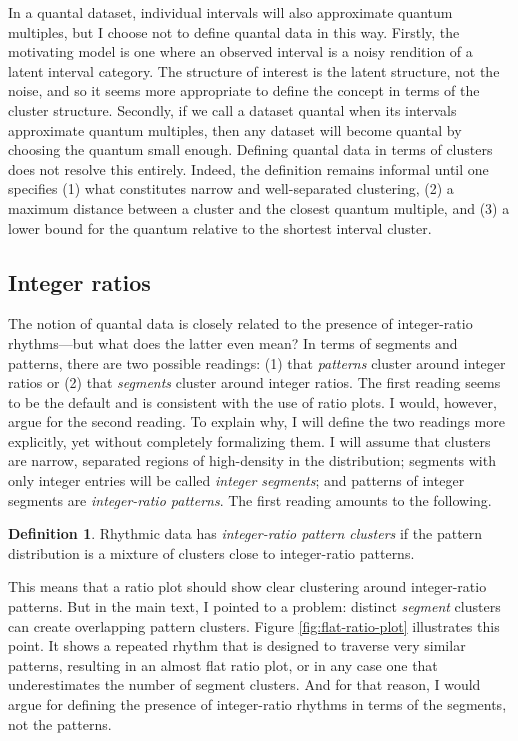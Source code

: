 \documentclass[suppldata]{tMAM2e}%
\theoremstyle{plain}
\theoremstyle{definition}
\newtheorem{definition}[theorem]{Definition}
\theoremstyle{remark}
\begin{document}
In a quantal dataset, individual intervals will also approximate quantum multiples, but I choose not to define quantal data in this way.
Firstly, the motivating model is one where an observed interval is a noisy rendition of a latent interval category.
The structure of interest is the latent structure, not the noise, and so it seems more appropriate to define the concept in terms of the cluster structure.
Secondly, if we call a dataset quantal when its intervals approximate quantum multiples, then any dataset will become quantal by choosing the quantum small enough.
Defining quantal data in terms of clusters does not resolve this entirely.
Indeed, the definition remains informal until one specifies (1) what constitutes narrow and well-separated clustering, (2) a maximum distance between a cluster and the closest quantum multiple, and (3) a lower bound for the quantum relative to the shortest interval cluster.



\subsection{Integer ratios}

The notion of quantal data is closely related to the presence of integer-ratio rhythms—but what does the latter even mean?
In terms of segments and patterns, there are two possible readings: (1) that \emph{patterns} cluster around integer ratios or (2) that \emph{segments} cluster around integer ratios.
The first reading seems to be the default and is consistent with the use of ratio plots.
I would, however, argue for the second reading.
To explain why, I will define the two readings more explicitly, yet without completely formalizing them.
I will assume that clusters are narrow, separated regions of high-density in the distribution;
segments with only integer entries will be called \emph{integer segments}; and patterns of integer segments are \emph{integer-ratio patterns}. 
The first reading amounts to the following.


\begin{definition}
  Rhythmic data has \emph{integer-ratio pattern clusters} if the pattern distribution is a mixture of clusters close to integer-ratio patterns.
\end{definition}

This means that a ratio plot should show clear clustering around integer-ratio patterns.
But in the main text, I pointed to a problem: distinct \emph{segment} clusters can create overlapping pattern clusters.
Figure \ref{fig:flat-ratio-plot} illustrates this point. 
It shows a repeated rhythm that is designed to traverse very similar patterns, resulting in an almost flat ratio plot, or in any case one that underestimates the number of segment clusters.
And for that reason, I would argue for defining the presence of integer-ratio rhythms in terms of the segments, not the patterns.
\end{document}
